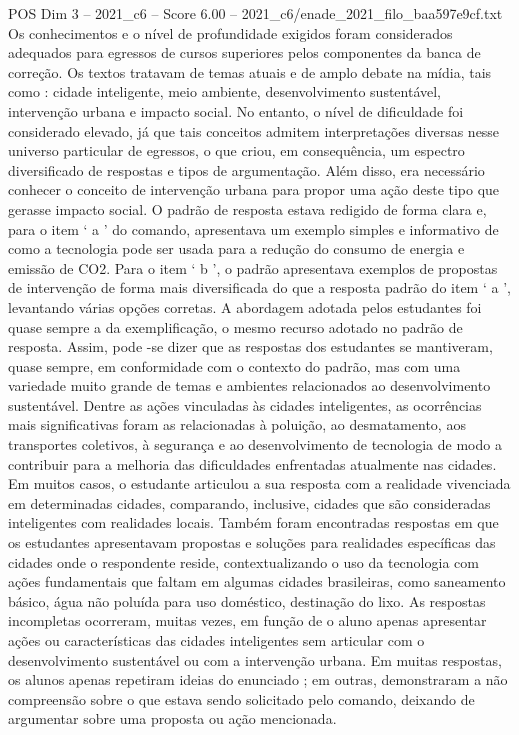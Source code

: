 \begin{textsample}{POS Dim 3 – 2021\_c6 – Score 6.00 – 2021\_c6/enade\_2021\_filo\_baa597e9cf.txt}
Os conhecimentos e o nível de profundidade exigidos foram considerados adequados para egressos de cursos superiores pelos componentes da banca de correção.
Os textos tratavam de temas atuais e de amplo debate na mídia, tais como : cidade inteligente, meio ambiente, desenvolvimento sustentável, intervenção urbana e impacto social.
No entanto, o nível de dificuldade foi considerado elevado, já que tais conceitos admitem interpretações diversas nesse universo particular de egressos, o que criou, em consequência, um espectro diversificado de respostas e tipos de argumentação.
Além disso, era necessário conhecer o conceito de intervenção urbana para propor uma ação deste tipo que gerasse impacto social.
O padrão de resposta estava redigido de forma clara e, para o item ‘ a ’ do comando, apresentava um exemplo simples e informativo de como a tecnologia pode ser usada para a redução do consumo de energia e emissão de CO2.
Para o item ‘ b ’, o padrão apresentava exemplos de propostas de intervenção de forma mais diversificada do que a resposta padrão do item ‘ a ’, levantando várias opções corretas.
A abordagem adotada pelos estudantes foi quase sempre a da exemplificação, o mesmo recurso adotado no padrão de resposta.
Assim, pode -se dizer que as respostas dos estudantes se mantiveram, quase sempre, em conformidade com o contexto do padrão, mas com uma variedade muito grande de temas e ambientes relacionados ao desenvolvimento sustentável.
Dentre as ações vinculadas às cidades inteligentes, as ocorrências mais significativas foram as relacionadas à poluição, ao desmatamento, aos transportes coletivos, à segurança e ao desenvolvimento de tecnologia de modo a contribuir para a melhoria das dificuldades enfrentadas atualmente nas cidades.
Em muitos casos, o estudante articulou a sua resposta com a realidade vivenciada em determinadas cidades, comparando, inclusive, cidades que são consideradas inteligentes com realidades locais.
Também foram encontradas respostas em que os estudantes apresentavam propostas e soluções para realidades específicas das cidades onde o respondente reside, contextualizando o uso da tecnologia com ações fundamentais que faltam em algumas cidades brasileiras, como saneamento básico, água não poluída para uso doméstico, destinação do lixo.
As respostas incompletas ocorreram, muitas vezes, em função de o aluno apenas apresentar ações ou características das cidades inteligentes sem articular com o desenvolvimento sustentável ou com a intervenção urbana.
Em muitas respostas, os alunos apenas repetiram ideias do enunciado ; em outras, demonstraram a não compreensão sobre o que estava sendo solicitado pelo comando, deixando de argumentar sobre uma proposta ou ação mencionada.

\end{textsample}
